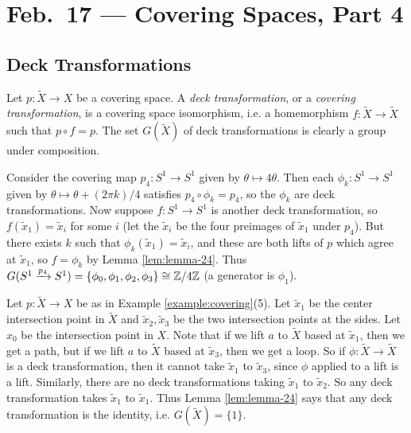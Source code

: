 \chapter{Feb.~17 --- Covering Spaces, Part 4}

\section{Deck Transformations}

\begin{definition}
  Let $p : \widetilde{X} \to X$ be a covering
  space. A \emph{deck transformation}, or
  a \emph{covering transformation}, is a
  covering space isomorphism, i.e. a
  homemorphism $f : \widetilde{X} \to \widetilde{X}$
  such that $p \circ f = p$. The set
  $G(\widetilde{X})$ of deck transformations
  is clearly a group under composition.
\end{definition}

\begin{example}
  Consider the covering map $p_4 : S^1 \to S^1$
  given by $\theta \mapsto 4\theta$.
  Then each $\phi_k : S^1 \to S^1$ given by
  $\theta \mapsto \theta + (2\pi k) / 4$ satisfies
  $p_4 \circ \phi_k = p_4$, so the $\phi_k$ are deck
  transformations. Now suppose $f : S^1 \to S^1$
  is another deck transformation, so
  $f(\widetilde{x}_1) = \widetilde{x}_i$ for some
  $i$ (let the $\widetilde{x}_i$ be the four preimages
  of $\widetilde{x}_1$ under $p_4$).
  But there exists $k$ such that
  $\phi_k(\widetilde{x}_1) = \widetilde{x}_i$,
  and these are both lifts of $p$ which agree at
  $\widetilde{x}_1$, so
  $f = \phi_k$ by Lemma \ref{lem:lemma-24}.
  Thus $G(S^1 \xrightarrow{p_4} S^1) = \{\phi_0, \phi_1, \phi_2, \phi_3\} \cong \mathbb{Z} / 4\mathbb{Z}$ (a generator is $\phi_1$).
\end{example}

\begin{example}
  Let $p : \widetilde{X} \to X$ be as
  in Example \ref{example:covering}(5).
  Let $\widetilde{x}_1$ be the center intersection
  point in
  $\widetilde{X}$ and $\widetilde{x}_2, \widetilde{x}_3$
  be the two intersection points at the sides.
  Let $x_0$ be the intersection point in $X$. Note that
  if we lift $a$ to $\widetilde{X}$ based at
  $\widetilde{x}_1$, then we get a path,
  but if we lift $a$ to $\widetilde{X}$
  based at $\widetilde{x}_3$, then we get a loop.
  So if $\phi : \widetilde{X} \to \widetilde{X}$
  is a deck transformation, then it cannot take
  $\widetilde{x}_1$ to $\widetilde{x}_3$, since
  $\phi$ applied to a lift is a lift. Similarly, there
  are no deck transformations taking $\widetilde{x}_1$
  to $\widetilde{x}_2$. So any deck transformation
  takes $\widetilde{x}_1$ to $\widetilde{x}_1$.
  Thus Lemma \ref{lem:lemma-24} says that any deck
  transformation is the identity, i.e.
  $G(\widetilde{X}) = \{1\}$.
\end{example}

